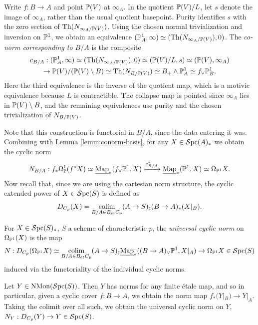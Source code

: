 \documentclass{amsart}
\renewcommand{\NB}[1]{}
\numberwithin{proposition}{section}
\numberwithin{equation}{section}
\def\NMon{\mathrm{NMon}}
\begin{document}
\begin{construction}
Write $f:B\to A$ and point $\P(V)$ at $\infty_A$.
In the quotient $\P(V)/L$, let $s$ denote the image of $\infty_A$, rather than the usual quotient basepoint.
Purity identifies $s$ with the zero section of $\Th(N_{\infty_A/\P(V)})$.
Using the chosen normal trivialization and inversion on $\P^1$, we obtain an equivalence $(\P^1_A,\infty)\wequi(\Th(N_{\infty_A/\P(V)}),0)$.
The \emph{co-norm corresponding to $B/A$} is the composite \begin{gather*} c_{B/A}: (\P^1_A,\infty) \wequi (\Th(N_{\infty_A/\P(V)}),0) \wequi (\P(V)/L,s) \wequi (\P(V),\infty_A) \\ \to \P(V)/(\P(V)\setminus B) \wequi \Th(N_{B/\P(V)}) \wequi B_+\wedge\P^1_A \wequi f_\vee\P^1_B. \end{gather*}
Here the third equivalence is the inverse of the quotient map, which is a motivic equivalence because $L$ is contractible.\NB{It's the complement of $\infty$ in $\P(V)$... Also it's an affine line torsor, so Zariski-locally isomorphic to $\A^1$.}
The collapse map is pointed since $\infty_A$ lies in $\P(V)\setminus B$, and the remaining equivalences use purity \cite[\S3.2]{A1-homotopy-theory} and the chosen trivialization of $N_{B/\P(V)}$.
\end{construction}
Note that this construction is functorial in $B/A$, since the data entering it was.
Combining with Lemma \ref{lemm:conorm-basis}, for any $X \in \Spc(A)_*$ we obtain the cyclic norm \[ N_{B/A}: f_* \Omega_\P^1(f^*X) \wequi \iMap_*(f_\vee \P^1, X) \xrightarrow{c_{B/A}^*} \iMap_*(\P^1, X) \wequi \Omega_{\P^1} X. \]
Now recall that, since we are using the cartesian norm structure, the cyclic extended power of $X \in \Spc(S)$ is defined as \[ D_{C_p}(X) = \colim_{B/A \in B_\et C_p} (A \to S)_\sharp(B \to A)_*(X|_B). \]

\begin{definition} \label{def:cyclic-norm}
For $X \in \Spc(S)_*$, $S$ a scheme of characteristic $p$, the \emph{universal cyclic norm} on $\Omega_{\P^1}(X)$ is the map \[ N: D_{C_p}(\Omega_{\P^1} X) \wequi \colim_{B/A \in B_\et C_p} (A \to S)_\sharp \iMap_*((B \to A)_\vee \P^1, X|_A) \to \Omega_{\P^1} X \in \Spc(S) \] induced via the functoriality of the individual cyclic norms.
\end{definition}

Let $Y \in \NMon(\Spc(S))$.
Then $Y$ has norms for any finite étale map, and so in particular, given a cyclic cover $f: B \to A$, we obtain the norm map $f_*(Y|_B) \to Y|_A$.
Taking the colimit over all such, we obtain the universal cyclic norm on $Y$, $N_Y: D_{C_p}(Y) \to Y \in \Spc(S)$.
\end{document}
